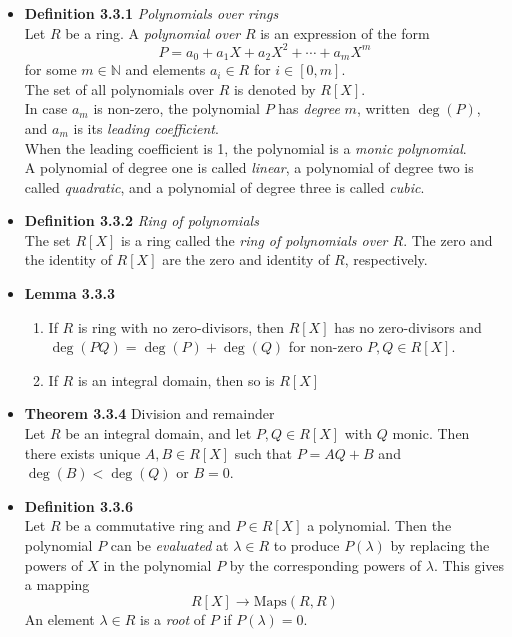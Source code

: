 \documentclass[11pt,a4paper]{article}
\begin{document}
\begin{itemize}

    \item \textbf{Definition 3.3.1} \emph{Polynomials over rings} \\
        Let $R$ be a ring.
        A \emph{polynomial over} $R$ is an expression of the form
        \[
            P = a_0 + a_1X + a_2{X^2} + \cdots + a_m{X^m}
        \]
        for some $m \in \mathbb{N}$ and elements $a_i \in R$ for $i \in [0,m]$.\\
        The set of all polynomials over $R$ is denoted by $R[X]$.\\
        In case $a_m$ is non-zero, the polynomial $P$ has \emph{degree} $m$, written
        $\deg(P)$, and $a_m$ is its \emph{leading coefficient}. \\
        When the leading coefficient is 1, the polynomial is a \emph{monic polynomial}.\\
        A polynomial of degree one is called \emph{linear},
        a polynomial of degree two is called \emph{quadratic},
        and a polynomial of degree three is called \emph{cubic}.

    \item \textbf{Definition 3.3.2} \emph{Ring of polynomials} \\
        The set $R[X]$ is a ring called the \emph{ring of polynomials over $R$}.
        The zero and the identity of $R[X]$ are the zero and identity of $R$, respectively.

    \item \textbf{Lemma 3.3.3}
        \begin{enumerate}
            \item If $R$ is ring with no zero-divisors, then $R[X]$ has no zero-divisors and
                $\deg(PQ) = \deg(P) + \deg(Q)$ for non-zero $P,Q \in R[X]$.
            \item If $R$ is an integral domain, then so is $R{[X]}$
        \end{enumerate}

    \item \textbf{Theorem 3.3.4} Division and remainder \\
        Let $R$ be an integral domain, and let $P,Q \in R[X]$ with $Q$ monic.
        Then there exists unique $A,B \in R{[X]}$ such that
        $P=AQ + B$ and $\deg(B) < \deg(Q)$ or $B=0$.

    \item \textbf{Definition 3.3.6} \\
        Let $R$ be a commutative ring and $P \in R[X]$ a polynomial.
        Then the polynomial $P$ can be \emph{evaluated} at $\lambda \in R$ to produce
        $P(\lambda)$
        by replacing the powers of $X$ in the polynomial $P$ by the corresponding powers of
        $\lambda$.
        This gives a mapping
        \[
            R[X] \to \mathrm{Maps}(R,R)
        \]
        An element $\lambda \in R$ is a \emph{root} of $P$ if $P(\lambda) = 0$.


\end{itemize}
\end{document}
